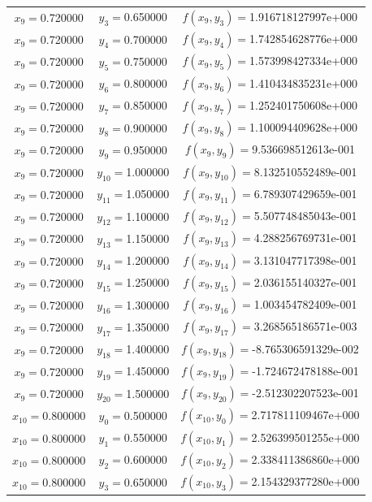 \begin{longtable}{ccc}
$x_{9}=$0.720000 & $y_{3}=$0.650000 & $f(x_{9},y_{3})=$1.916718127997e+000 \\
$x_{9}=$0.720000 & $y_{4}=$0.700000 & $f(x_{9},y_{4})=$1.742854628776e+000 \\
$x_{9}=$0.720000 & $y_{5}=$0.750000 & $f(x_{9},y_{5})=$1.573998427334e+000 \\
$x_{9}=$0.720000 & $y_{6}=$0.800000 & $f(x_{9},y_{6})=$1.410434835231e+000 \\
$x_{9}=$0.720000 & $y_{7}=$0.850000 & $f(x_{9},y_{7})=$1.252401750608e+000 \\
$x_{9}=$0.720000 & $y_{8}=$0.900000 & $f(x_{9},y_{8})=$1.100094409628e+000 \\
$x_{9}=$0.720000 & $y_{9}=$0.950000 & $f(x_{9},y_{9})=$9.536698512613e-001 \\
$x_{9}=$0.720000 & $y_{10}=$1.000000 & $f(x_{9},y_{10})=$8.132510552489e-001 \\
$x_{9}=$0.720000 & $y_{11}=$1.050000 & $f(x_{9},y_{11})=$6.789307429659e-001 \\
$x_{9}=$0.720000 & $y_{12}=$1.100000 & $f(x_{9},y_{12})=$5.507748485043e-001 \\
$x_{9}=$0.720000 & $y_{13}=$1.150000 & $f(x_{9},y_{13})=$4.288256769731e-001 \\
$x_{9}=$0.720000 & $y_{14}=$1.200000 & $f(x_{9},y_{14})=$3.131047717398e-001 \\
$x_{9}=$0.720000 & $y_{15}=$1.250000 & $f(x_{9},y_{15})=$2.036155140327e-001 \\
$x_{9}=$0.720000 & $y_{16}=$1.300000 & $f(x_{9},y_{16})=$1.003454782409e-001 \\
$x_{9}=$0.720000 & $y_{17}=$1.350000 & $f(x_{9},y_{17})=$3.268565186571e-003 \\
$x_{9}=$0.720000 & $y_{18}=$1.400000 & $f(x_{9},y_{18})=$-8.765306591329e-002 \\
$x_{9}=$0.720000 & $y_{19}=$1.450000 & $f(x_{9},y_{19})=$-1.724672478188e-001 \\
$x_{9}=$0.720000 & $y_{20}=$1.500000 & $f(x_{9},y_{20})=$-2.512302207523e-001 \\
$x_{10}=$0.800000 & $y_{0}=$0.500000 & $f(x_{10},y_{0})=$2.717811109467e+000 \\
$x_{10}=$0.800000 & $y_{1}=$0.550000 & $f(x_{10},y_{1})=$2.526399501255e+000 \\
$x_{10}=$0.800000 & $y_{2}=$0.600000 & $f(x_{10},y_{2})=$2.338411386860e+000 \\
$x_{10}=$0.800000 & $y_{3}=$0.650000 & $f(x_{10},y_{3})=$2.154329377280e+000 \\

\end{longtable}
